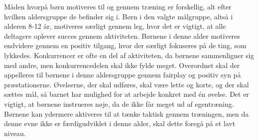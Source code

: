 Måden hvorpå børn motiveres til og gennem træning er forskellig, alt efter hvilken aldersgruppe de befinder sig i. Børn i den valgte målgruppe, altså i alderen 8-12 år, motiveres særligt gennem leg, hvor det er vigtigt, at alle deltagere oplever succes gennem aktiviteten. Børnene i denne alder motiveres endvidere gennem en positiv tilgang, hvor der særligt fokuseres på de ting, som lykkedes. Konkurrencer er ofte en del af aktiviteten, da børnene sammenligner sig med andre, men konkurrencedelen skal ikke fylde meget. Overordnet skal der appelleres til børnene i denne aldersgruppe gennem fairplay og positiv syn på præstationerne. Øvelserne, der skal udføres, skal være lette og korte, og der skal sættes mål, så barnet har mulighed for at arbejde konkret med én øvelse. Det er vigtigt, at børnene instrueres nøje, da de ikke får meget ud af egentræning. Børnene kan ydermere aktiveres til at tænke taktisk gennem træningen, men da denne evne ikke er færdigudviklet i denne alder, skal dette foregå på et lavt niveau. \citep{Wied2011} 

